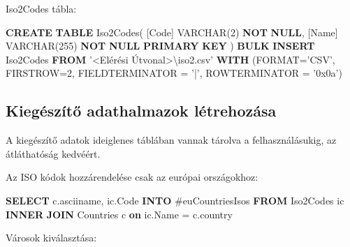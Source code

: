 \documentclass[
]{article}
\newenvironment{Shaded}{\begin{snugshade}}{\end{snugshade}}
\newcommand{\DataTypeTok}[1]{\textcolor[rgb]{0.56,0.13,0.00}{#1}}
\newcommand{\DecValTok}[1]{\textcolor[rgb]{0.25,0.63,0.44}{#1}}
\newcommand{\KeywordTok}[1]{\textcolor[rgb]{0.00,0.44,0.13}{\textbf{#1}}}
\newcommand{\NormalTok}[1]{#1}
\newcommand{\OperatorTok}[1]{\textcolor[rgb]{0.40,0.40,0.40}{#1}}
\newcommand{\StringTok}[1]{\textcolor[rgb]{0.25,0.44,0.63}{#1}}
\begin{document}
Iso2Codes tábla:

\begin{Shaded}
\begin{Highlighting}[]
\KeywordTok{CREATE} \KeywordTok{TABLE}\NormalTok{ Iso2Codes(}
\NormalTok{    [Code] }\DataTypeTok{VARCHAR}\NormalTok{(}\DecValTok{2}\NormalTok{) }\KeywordTok{NOT} \KeywordTok{NULL}\NormalTok{,}
\NormalTok{    [Name] }\DataTypeTok{VARCHAR}\NormalTok{(}\DecValTok{255}\NormalTok{) }\KeywordTok{NOT} \KeywordTok{NULL} \KeywordTok{PRIMARY} \KeywordTok{KEY}
\NormalTok{)}
\KeywordTok{BULK} \KeywordTok{INSERT}\NormalTok{ Iso2Codes}
\KeywordTok{FROM} \StringTok{'<Elérési Útvonal>\textbackslash{}iso2.csv'}
\KeywordTok{WITH}\NormalTok{ (FORMAT}\OperatorTok{=}\StringTok{'CSV'}\NormalTok{,}
\NormalTok{    FIRSTROW}\OperatorTok{=}\DecValTok{2}\NormalTok{,}
\NormalTok{    FIELDTERMINATOR }\OperatorTok{=} \StringTok{'|'}\NormalTok{,}
\NormalTok{    ROWTERMINATOR }\OperatorTok{=} \StringTok{'0x0a'}\NormalTok{)}
\end{Highlighting}
\end{Shaded}

\hypertarget{kieguxe9szuxedtux151-adathalmazok-luxe9trehozuxe1sa}{%
\subsection{Kiegészítő adathalmazok
létrehozása}\label{kieguxe9szuxedtux151-adathalmazok-luxe9trehozuxe1sa}}

A kiegészítő adatok ideiglenes táblában vannak tárolva a
felhasználásukig, az átláthatóság kedvéért.

Az ISO kódok hozzárendelése csak az európai országokhoz:

\begin{Shaded}
\begin{Highlighting}[]
\KeywordTok{SELECT}\NormalTok{ c.asciiname, ic.Code}
\KeywordTok{INTO}\NormalTok{ #euCountriesIsos}
\KeywordTok{FROM}\NormalTok{ Iso2Codes ic}
\KeywordTok{INNER} \KeywordTok{JOIN}\NormalTok{ Countries c }\KeywordTok{on}\NormalTok{ ic.Name }\OperatorTok{=}\NormalTok{ c.country}
\end{Highlighting}
\end{Shaded}

Városok kiválasztása:
\end{document}
